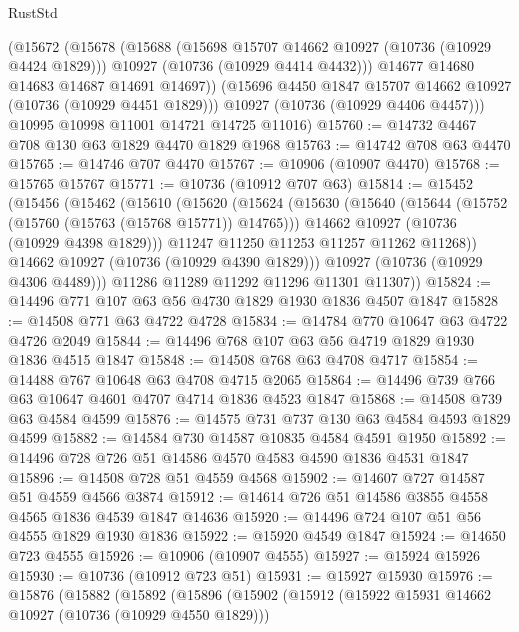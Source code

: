 \begin{lexlean}{RustStd}
\begin{coremodule}
        (@15672
          (@15678
            (@15688
              (@15698 @15707 @14662 @10927 (@10736 (@10929 @4424 @1829)))
              @10927
              (@10736 (@10929 @4414 @4432)))
            @14677
            @14680
            @14683
            @14687
            @14691
            @14697))
        (@15696 @4450 @1847 @15707 @14662 @10927 (@10736 (@10929 @4451 @1829)))
        @10927
        (@10736 (@10929 @4406 @4457)))
      @10995
      @10998
      @11001
      @14721
      @14725
      @11016)
@15760 := @14732 @4467 @708 @130 @63 @1829 @4470 @1829 @1968
@15763 := @14742 @708 @63 @4470
@15765 := @14746 @707 @4470
@15767 := @10906 (@10907 @4470)
@15768 := @15765 @15767
@15771 := @10736 (@10912 @707 @63)
@15814 := @15452
    (@15456
      (@15462
        (@15610
          (@15620
            (@15624
              (@15630
                (@15640
                  (@15644 (@15752 (@15760 (@15763 (@15768 @15771)) @14765)))
                  @14662
                  @10927
                  (@10736 (@10929 @4398 @1829)))
                @11247
                @11250
                @11253
                @11257
                @11262
                @11268))
            @14662
            @10927
            (@10736 (@10929 @4390 @1829)))
          @10927
          (@10736 (@10929 @4306 @4489)))
        @11286
        @11289
        @11292
        @11296
        @11301
        @11307))
@15824 := @14496 @771 @107 @63 @56 @4730 @1829 @1930 @1836 @4507 @1847
@15828 := @14508 @771 @63 @4722 @4728
@15834 := @14784 @770 @10647 @63 @4722 @4726 @2049
@15844 := @14496 @768 @107 @63 @56 @4719 @1829 @1930 @1836 @4515 @1847
@15848 := @14508 @768 @63 @4708 @4717
@15854 := @14488 @767 @10648 @63 @4708 @4715 @2065
@15864 := @14496 @739 @766 @63 @10647 @4601 @4707 @4714 @1836 @4523 @1847
@15868 := @14508 @739 @63 @4584 @4599
@15876 := @14575 @731 @737 @130 @63 @4584 @4593 @1829 @4599
@15882 := @14584 @730 @14587 @10835 @4584 @4591 @1950
@15892 := @14496 @728 @726 @51 @14586 @4570 @4583 @4590 @1836 @4531 @1847
@15896 := @14508 @728 @51 @4559 @4568
@15902 := @14607 @727 @14587 @51 @4559 @4566 @3874
@15912 := @14614 @726 @51 @14586 @3855 @4558 @4565 @1836 @4539 @1847 @14636
@15920 := @14496 @724 @107 @51 @56 @4555 @1829 @1930 @1836
@15922 := @15920 @4549 @1847
@15924 := @14650 @723 @4555
@15926 := @10906 (@10907 @4555)
@15927 := @15924 @15926
@15930 := @10736 (@10912 @723 @51)
@15931 := @15927 @15930
@15976 := @15876
    (@15882
      (@15892
        (@15896
          (@15902
            (@15912
              (@15922 @15931 @14662 @10927 (@10736 (@10929 @4550 @1829)))

\end{coremodule}
\end{lexlean}
